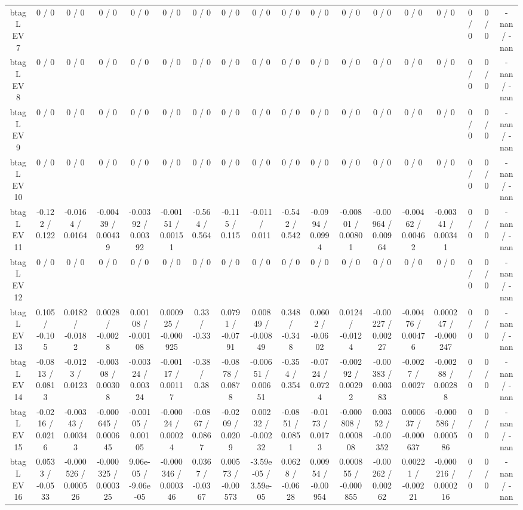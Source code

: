 \documentclass[10pt]{article}
\begin{document}
\begin{table}[htbp]
\begin{center}
\begin{tabular}{|c|c|c|c|c|c|c|c|c|c|c|c|c|c|c|c|c|c|}
  btag L EV 7 & 0 / 0 & 0 / 0 & 0 / 0 & 0 / 0 & 0 / 0 & 0 / 0 & 0 / 0 & 0 / 0 & 0 / 0 & 0 / 0 & 0 / 0 & 0 / 0 & 0 / 0 & 0 / 0 & 0 / 0 & 0 / 0 & -nan / -nan \\ 
  btag L EV 8 & 0 / 0 & 0 / 0 & 0 / 0 & 0 / 0 & 0 / 0 & 0 / 0 & 0 / 0 & 0 / 0 & 0 / 0 & 0 / 0 & 0 / 0 & 0 / 0 & 0 / 0 & 0 / 0 & 0 / 0 & 0 / 0 & -nan / -nan \\ 
  btag L EV 9 & 0 / 0 & 0 / 0 & 0 / 0 & 0 / 0 & 0 / 0 & 0 / 0 & 0 / 0 & 0 / 0 & 0 / 0 & 0 / 0 & 0 / 0 & 0 / 0 & 0 / 0 & 0 / 0 & 0 / 0 & 0 / 0 & -nan / -nan \\ 
  btag L EV 10 & 0 / 0 & 0 / 0 & 0 / 0 & 0 / 0 & 0 / 0 & 0 / 0 & 0 / 0 & 0 / 0 & 0 / 0 & 0 / 0 & 0 / 0 & 0 / 0 & 0 / 0 & 0 / 0 & 0 / 0 & 0 / 0 & -nan / -nan \\ 
  btag L EV 11 & -0.122 / 0.122 & -0.0164 / 0.0164 & -0.00439 / 0.00439 & -0.00392 / 0.00392 & -0.00151 / 0.00151 & -0.564 / 0.564 & -0.115 / 0.115 & -0.011 / 0.011 & -0.542 / 0.542 & -0.0994 / 0.0994 & -0.00801 / 0.00801 & -0.00964 / 0.00964 & -0.00462 / 0.00462 & -0.00341 / 0.00341 & 0 / 0 & 0 / 0 & -nan / -nan \\ 
  btag L EV 12 & 0 / 0 & 0 / 0 & 0 / 0 & 0 / 0 & 0 / 0 & 0 / 0 & 0 / 0 & 0 / 0 & 0 / 0 & 0 / 0 & 0 / 0 & 0 / 0 & 0 / 0 & 0 / 0 & 0 / 0 & 0 / 0 & -nan / -nan \\ 
  btag L EV 13 & 0.105 / -0.105 & 0.0182 / -0.0182 & 0.0028 / -0.0028 & 0.00108 / -0.00108 & 0.000925 / -0.000925 & 0.33 / -0.33 & 0.0791 / -0.0791 & 0.00849 / -0.00849 & 0.348 / -0.348 & 0.0602 / -0.0602 & 0.0124 / -0.0124 & -0.00227 / 0.00227 & -0.00476 / 0.00476 & 0.000247 / -0.000247 & 0 / 0 & 0 / 0 & -nan / -nan \\ 
  btag L EV 14 & -0.0813 / 0.0813 & -0.0123 / 0.0123 & -0.00308 / 0.00308 & -0.00324 / 0.00324 & -0.00117 / 0.00117 & -0.38 / 0.38 & -0.0878 / 0.0878 & -0.00651 / 0.00651 & -0.354 / 0.354 & -0.0724 / 0.0724 & -0.00292 / 0.00292 & -0.00383 / 0.00383 & -0.0027 / 0.0027 & -0.00288 / 0.00288 & 0 / 0 & 0 / 0 & -nan / -nan \\ 
  btag L EV 15 & -0.0216 / 0.0216 & -0.00343 / 0.00343 & -0.000645 / 0.000645 & -0.00105 / 0.00105 & -0.00024 / 0.00024 & -0.0867 / 0.0867 & -0.0209 / 0.0209 & 0.00232 / -0.00232 & -0.0851 / 0.0851 & -0.0173 / 0.0173 & -0.000808 / 0.000808 & 0.00352 / -0.00352 & 0.000637 / -0.000637 & -0.000586 / 0.000586 & 0 / 0 & 0 / 0 & -nan / -nan \\ 
  btag L EV 16 & 0.0533 / -0.0533 & -0.000526 / 0.000526 & -0.000325 / 0.000325 & 9.06e-05 / -9.06e-05 & -0.000346 / 0.000346 & 0.0367 / -0.0367 & 0.00573 / -0.00573 & -3.59e-05 / 3.59e-05 & 0.0628 / -0.0628 & 0.00954 / -0.00954 & 0.000855 / -0.000855 & -0.00262 / 0.00262 & 0.00221 / -0.00221 & -0.000216 / 0.000216 & 0 / 0 & 0 / 0 & -nan / -nan \\ 

\end{tabular}
\end{center}
\end{table}
\end{document}
